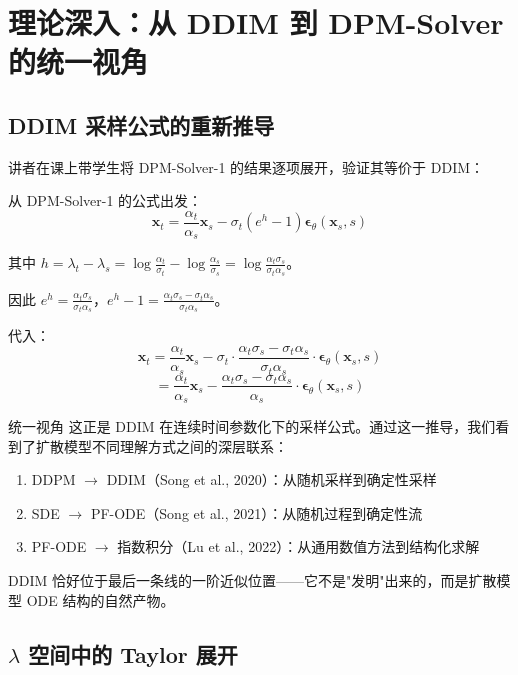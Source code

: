 \section{理论深入：从 DDIM 到 DPM-Solver 的统一视角}

\subsection{DDIM 采样公式的重新推导}

讲者在课上带学生将 DPM-Solver-1 的结果逐项展开，验证其等价于 DDIM：

从 DPM-Solver-1 的公式出发：
$$\mathbf{x}_t = \frac{\alpha_t}{\alpha_s} \mathbf{x}_s - \sigma_t (e^{h} - 1) \boldsymbol{\epsilon}_\theta(\mathbf{x}_s, s)$$

其中 $h = \lambda_t - \lambda_s = \log\frac{\alpha_t}{\sigma_t} - \log\frac{\alpha_s}{\sigma_s} = \log\frac{\alpha_t \sigma_s}{\sigma_t \alpha_s}$。

因此 $e^h = \frac{\alpha_t \sigma_s}{\sigma_t \alpha_s}$，$e^h - 1 = \frac{\alpha_t \sigma_s - \sigma_t \alpha_s}{\sigma_t \alpha_s}$。

代入：
$$\mathbf{x}_t = \frac{\alpha_t}{\alpha_s} \mathbf{x}_s - \sigma_t \cdot \frac{\alpha_t \sigma_s - \sigma_t \alpha_s}{\sigma_t \alpha_s} \cdot \boldsymbol{\epsilon}_\theta(\mathbf{x}_s, s)$$
$$= \frac{\alpha_t}{\alpha_s} \mathbf{x}_s - \frac{\alpha_t \sigma_s - \sigma_t \alpha_s}{\alpha_s} \cdot \boldsymbol{\epsilon}_\theta(\mathbf{x}_s, s)$$

\begin{importantbox}{统一视角}
这正是 DDIM 在连续时间参数化下的采样公式。通过这一推导，我们看到了扩散模型不同理解方式之间的深层联系：
\begin{enumerate}
    \item DDPM $\to$ DDIM（Song et al., 2020）：从随机采样到确定性采样
    \item SDE $\to$ PF-ODE（Song et al., 2021）：从随机过程到确定性流
    \item PF-ODE $\to$ 指数积分（Lu et al., 2022）：从通用数值方法到结构化求解
\end{enumerate}
DDIM 恰好位于最后一条线的一阶近似位置——它不是"发明"出来的，而是扩散模型 ODE 结构的自然产物。
\end{importantbox}

\subsection{$\lambda$ 空间中的 Taylor 展开}

